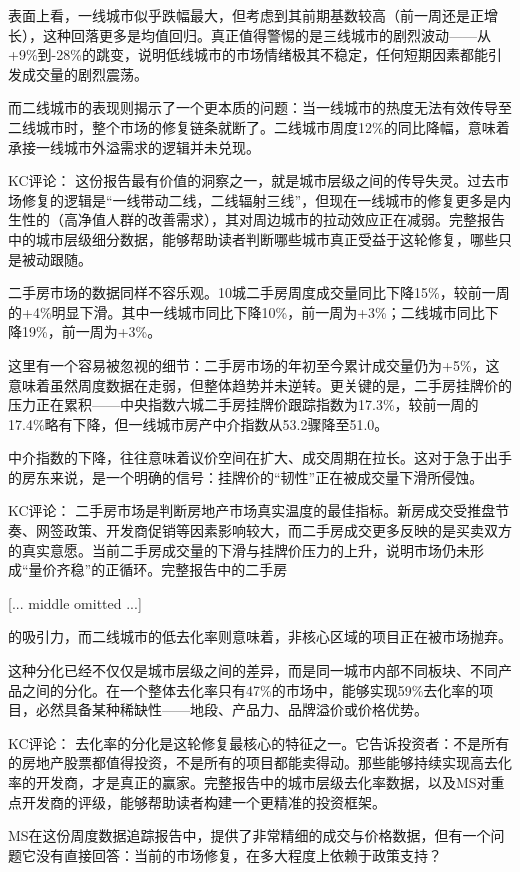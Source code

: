 \documentclass[11pt]{ctexart}
\begin{document}
表面上看，一线城市似乎跌幅最大，但考虑到其前期基数较高（前一周还是正增长），这种回落更多是均值回归。真正值得警惕的是三线城市的剧烈波动——从+9\%到-28\%的跳变，说明低线城市的市场情绪极其不稳定，任何短期因素都能引发成交量的剧烈震荡。

而二线城市的表现则揭示了一个更本质的问题：当一线城市的热度无法有效传导至二线城市时，整个市场的修复链条就断了。二线城市周度12\%的同比降幅，意味着承接一线城市外溢需求的逻辑并未兑现。

KC评论： 这份报告最有价值的洞察之一，就是城市层级之间的传导失灵。过去市场修复的逻辑是“一线带动二线，二线辐射三线”，但现在一线城市的修复更多是内生性的（高净值人群的改善需求），其对周边城市的拉动效应正在减弱。完整报告中的城市层级细分数据，能够帮助读者判断哪些城市真正受益于这轮修复，哪些只是被动跟随。

二手房市场的数据同样不容乐观。10城二手房周度成交量同比下降15\%，较前一周的+4\%明显下滑。其中一线城市同比下降10\%，前一周为+3\%；二线城市同比下降19\%，前一周为+3\%。

这里有一个容易被忽视的细节：二手房市场的年初至今累计成交量仍为+5\%，这意味着虽然周度数据在走弱，但整体趋势并未逆转。更关键的是，二手房挂牌价的压力正在累积——中央指数六城二手房挂牌价跟踪指数为17.3\%，较前一周的17.4\%略有下降，但一线城市房产中介指数从53.2骤降至51.0。

中介指数的下降，往往意味着议价空间在扩大、成交周期在拉长。这对于急于出手的房东来说，是一个明确的信号：挂牌价的“韧性”正在被成交量下滑所侵蚀。

KC评论： 二手房市场是判断房地产市场真实温度的最佳指标。新房成交受推盘节奏、网签政策、开发商促销等因素影响较大，而二手房成交更多反映的是买卖双方的真实意愿。当前二手房成交量的下滑与挂牌价压力的上升，说明市场仍未形成“量价齐稳”的正循环。完整报告中的二手房

[... middle omitted ...]

的吸引力，而二线城市的低去化率则意味着，非核心区域的项目正在被市场抛弃。

这种分化已经不仅仅是城市层级之间的差异，而是同一城市内部不同板块、不同产品之间的分化。在一个整体去化率只有47\%的市场中，能够实现59\%去化率的项目，必然具备某种稀缺性——地段、产品力、品牌溢价或价格优势。

KC评论： 去化率的分化是这轮修复最核心的特征之一。它告诉投资者：不是所有的房地产股票都值得投资，不是所有的项目都能卖得动。那些能够持续实现高去化率的开发商，才是真正的赢家。完整报告中的城市层级去化率数据，以及MS对重点开发商的评级，能够帮助读者构建一个更精准的投资框架。

MS在这份周度数据追踪报告中，提供了非常精细的成交与价格数据，但有一个问题它没有直接回答：当前的市场修复，在多大程度上依赖于政策支持？
\end{document}
